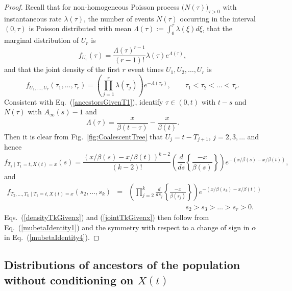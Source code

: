 \documentclass[preprint,12pt]{elsarticle}
\begin{document}
\begin{proof}
Recall that for non-homogeneous Poisson process $\big(N(\tau)\big)_{\tau > 0}$ with instantaneous rate $\lambda(\tau)$, the number of events 
$N(\tau)$ occurring in the interval $(0, \tau)$ is Poisson distributed with mean $\Lambda(\tau) := \int_0^\tau \lambda(\xi) d\xi$, 
that the marginal distribution of $U_r$ is
\[
f_{U_r}(\tau) = \frac{\Lambda(\tau)^{r - 1}}{(r - 1)!} \lambda(\tau)e^{\Lambda(\tau)}, 
\]
and that the joint density of the first $r$ event times $U_1, U_2, \ldots, U_r$ is 
\[
f_{U_1, \ldots, U_r}(\tau_1, \ldots, \tau_r) = \left(\prod_{j = 1}^r \lambda(\tau_j) \right) e^{-\Lambda(\tau_r)}, \qquad \tau_1 < \tau_2 < \ldots < \tau_r. 
\]
Consistent with Eq.~(\ref{ancestorsGivenT1}), identify $\tau \in (0, t)$ with $t - s$ and $N(\tau)$ with $A_\infty(s) - 1$ and 
\[
\Lambda(\tau) = \frac{x}{\beta(t - \tau)} - \frac{x}{\beta(t)}.  
\]
Then it is clear from Fig.~\ref{fig:CoalescentTree} that $U_j = t - T_{j + 1}$, $j = 2, 3, \ldots$ and hence 
\[
f_{T_k \mid T_1 = t, X(t) = x}(s) = \frac{(x/\beta(s) - x/\beta(t))^{k - 2}}{(k - 2)!} 
\left(\frac{d}{ds}\left\{\frac{-x}{\beta(s)}\right\} \right) e^{-(x/\beta(s) - x/\beta(t))},
\]
and 
\begin{eqnarray*}
f_{T_2, \ldots, T_k \mid T_1 = t, X(t) = x}(s_2, \ldots, s_k) & = & \left(\prod_{j = 2}^k \frac{d}{ds_j} \left\{\frac{-x}{\beta(s_j)}\right\} \right) e^{-(x/\beta(s_k) - x/\beta(t))} \nonumber \\
	&  & \qquad\qquad\qquad\qquad s_2 > s_3 > \ldots > s_r > 0. 
\end{eqnarray*}
Eqs.~(\ref{densityTkGivenx}) and (\ref{jointTkGivenx}) then follow from Eq.~(\ref{mubetaIdentity1}) and the symmetry with respect to a change of 
sign in $\alpha$ in Eq.~(\ref{mubetaIdentity4}).  
\end{proof}

%
%
\subsection{Distributions of ancestors of the population without conditioning on $X(t)$}
\label{sec:IntermediateAncestors}
\end{document}
